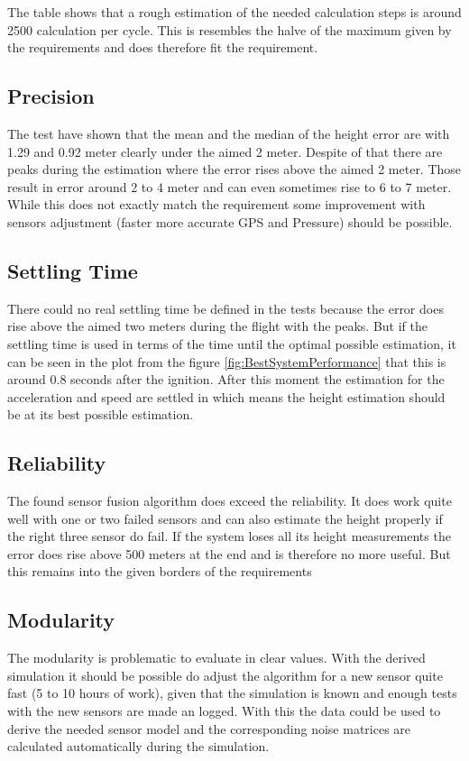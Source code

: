 The table shows that a rough estimation of the needed calculation steps is around 2500 calculation per cycle.
This is resembles the halve of the maximum given by the requirements and does therefore fit the requirement.
 
 
 \subsection{Precision}
 The test have shown that the mean and the median of the height error are with 1.29 and 0.92 meter clearly under the aimed 2 meter.
 Despite of that there are peaks during the estimation where the error rises above the aimed 2 meter.
 Those result in error around 2 to 4 meter and can even sometimes rise to 6 to 7 meter.
 While this does not exactly match the requirement some improvement with sensors adjustment (faster more accurate GPS and Pressure) should be possible.
 
 \subsection{Settling Time}
 There could no real settling time be defined in the tests because the error does rise above the aimed two meters during the flight with the peaks.
 But if the settling time is used in terms of the time until the optimal possible estimation,
 it can be seen in the plot from the figure \ref{fig:BestSystemPerformance} that this is around 0.8 seconds after the ignition.
 After this moment the estimation for the acceleration and speed are settled in which means the height estimation should be at its best possible estimation.
 
 \subsection{Reliability}
 The found sensor fusion algorithm does exceed the reliability. 
 It does work quite well with one or two failed sensors and can also estimate the height properly if the right three sensor do fail.
 If the system loses all its height measurements the error does rise above 500 meters at the end and is therefore no more useful.
 But this remains into the given borders of the requirements
 
 \subsection{Modularity}
 The modularity is problematic to evaluate in clear values.
 With the derived simulation it should be possible do adjust the algorithm for a new sensor quite fast (5 to 10 hours of work), 
 given that the simulation is known and enough tests with the new sensors are made an logged.
 With this the data could be used to derive the needed sensor model and the corresponding noise matrices are calculated automatically during the simulation.
 

